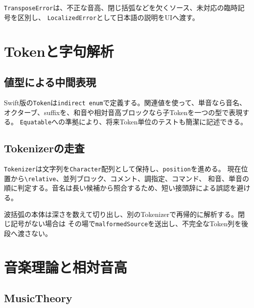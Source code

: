 \documentclass[uplatex,a4paper,11pt]{jsbook}
\begin{document}
\texttt{TransposeError}は、不正な音高、閉じ括弧などを欠くソース、未対応の臨時記号を区別し、
\texttt{LocalizedError}として日本語の説明をUIへ渡す。



\chapter{Tokenと字句解析}

\section{値型による中間表現}

Swift版の\texttt{Token}は\texttt{indirect enum}で定義する。関連値を使って、単音なら音名、
オクターブ、suffixを、和音や相対音高ブロックなら子Tokenを一つの型で表現する。
\texttt{Equatable}への準拠により、将来Token単位のテストも簡潔に記述できる。



\section{Tokenizerの走査}

\texttt{Tokenizer}は文字列を\texttt{Character}配列として保持し、\texttt{position}を進める。
現在位置から\texttt{\textbackslash relative}、並列ブロック、コメント、調指定、コマンド、
和音、単音の順に判定する。音名は長い候補から照合するため、短い接頭辞による誤認を避ける。

波括弧の本体は深さを数えて切り出し、別のTokenizerで再帰的に解析する。閉じ記号がない場合は
その場で\texttt{malformedSource}を送出し、不完全なToken列を後段へ渡さない。



\chapter{音楽理論と相対音高}

\section{MusicTheory}
\end{document}
